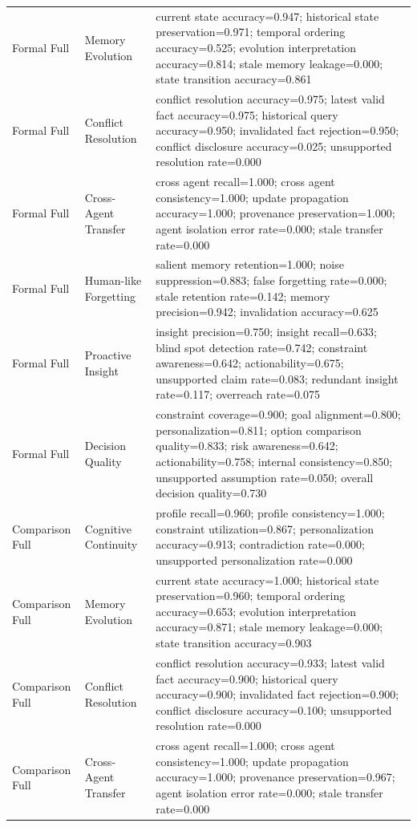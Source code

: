 \begin{longtable}{p{}p{}p{}}
Formal Full & Memory Evolution & current state accuracy=0.947; historical state preservation=0.971; temporal ordering accuracy=0.525; evolution interpretation accuracy=0.814; stale memory leakage=0.000; state transition accuracy=0.861 \\
Formal Full & Conflict Resolution & conflict resolution accuracy=0.975; latest valid fact accuracy=0.975; historical query accuracy=0.950; invalidated fact rejection=0.950; conflict disclosure accuracy=0.025; unsupported resolution rate=0.000 \\
Formal Full & Cross-Agent Transfer & cross agent recall=1.000; cross agent consistency=1.000; update propagation accuracy=1.000; provenance preservation=1.000; agent isolation error rate=0.000; stale transfer rate=0.000 \\
Formal Full & Human-like Forgetting & salient memory retention=1.000; noise suppression=0.883; false forgetting rate=0.000; stale retention rate=0.142; memory precision=0.942; invalidation accuracy=0.625 \\
Formal Full & Proactive Insight & insight precision=0.750; insight recall=0.633; blind spot detection rate=0.742; constraint awareness=0.642; actionability=0.675; unsupported claim rate=0.083; redundant insight rate=0.117; overreach rate=0.075 \\
Formal Full & Decision Quality & constraint coverage=0.900; goal alignment=0.800; personalization=0.811; option comparison quality=0.833; risk awareness=0.642; actionability=0.758; internal consistency=0.850; unsupported assumption rate=0.050; overall decision quality=0.730 \\
Comparison Full & Cognitive Continuity & profile recall=0.960; profile consistency=1.000; constraint utilization=0.867; personalization accuracy=0.913; contradiction rate=0.000; unsupported personalization rate=0.000 \\
Comparison Full & Memory Evolution & current state accuracy=1.000; historical state preservation=0.960; temporal ordering accuracy=0.653; evolution interpretation accuracy=0.871; stale memory leakage=0.000; state transition accuracy=0.903 \\
Comparison Full & Conflict Resolution & conflict resolution accuracy=0.933; latest valid fact accuracy=0.900; historical query accuracy=0.900; invalidated fact rejection=0.900; conflict disclosure accuracy=0.100; unsupported resolution rate=0.000 \\
Comparison Full & Cross-Agent Transfer & cross agent recall=1.000; cross agent consistency=1.000; update propagation accuracy=1.000; provenance preservation=0.967; agent isolation error rate=0.000; stale transfer rate=0.000 \\

\end{longtable}
